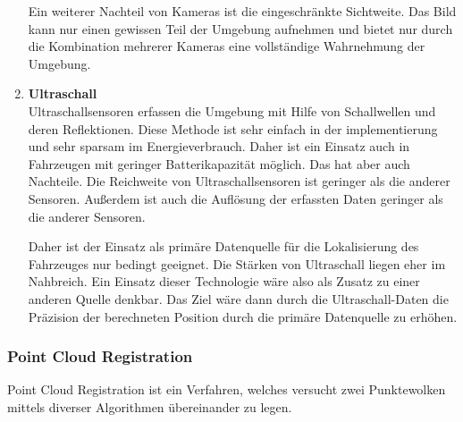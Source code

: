 \begin{enumerate}[leftmargin=*]
    Ein weiterer Nachteil von Kameras ist die eingeschränkte Sichtweite. 
    Das Bild kann nur einen gewissen Teil der Umgebung aufnehmen und bietet nur durch die Kombination mehrerer Kameras eine vollständige Wahrnehmung der Umgebung.


    \item \textbf{Ultraschall} \\
    Ultraschallsensoren erfassen die Umgebung mit Hilfe von Schallwellen und deren Reflektionen. 
    Diese Methode ist sehr einfach in der implementierung und sehr sparsam im Energieverbrauch. 
    Daher ist ein Einsatz auch in Fahrzeugen mit geringer Batterikapazität möglich.
    Das hat aber auch Nachteile. 
    Die Reichweite von Ultraschallsensoren ist geringer als die anderer Sensoren. 
    Außerdem ist auch die Auflösung der erfassten Daten geringer als die anderer Sensoren.

    Daher ist der Einsatz als primäre Datenquelle für die Lokalisierung des Fahrzeuges nur bedingt geeignet.
    Die Stärken von Ultraschall liegen eher im Nahbreich.
    Ein Einsatz dieser Technologie wäre also als Zusatz zu einer anderen Quelle denkbar. 
    Das Ziel wäre dann durch die Ultraschall-Daten die Präzision der berechneten Position durch die primäre Datenquelle zu erhöhen. 
\end{enumerate}

\subsubsection{Point Cloud Registration}
Point Cloud Registration ist ein Verfahren, welches versucht zwei Punktewolken mittels diverser Algorithmen übereinander zu legen.

\newpage
